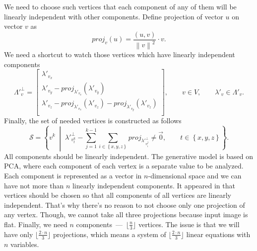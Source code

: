 We need to choose such vertices that each component of any of them
will be linearly independent with other components.
Define projection of vector $u$ on vector $v$ as
\begin{equation*}
  proj_v\left( u \right)
  = \frac{\left( u, v \right)}{\left\| v \right\|^2} \cdot v.
\end{equation*}
We need a shortcut to watch those vertices
which have linearly independent components
\begin{equation*}
  \Lambda'^{\perp}_v = \begin{bmatrix}
    \lambda'_{v_x} \\
    \lambda'_{v_y} - proj_{\lambda'_{v_x}}\left( \lambda'_{v_y} \right) \\
    \lambda'_{v_z} - proj_{\lambda'_{v_x}}\left( \lambda'_{v_z} \right)
                   - proj_{\lambda'_{v_y}}\left( \lambda'_{v_z} \right) \\
  \end{bmatrix},
  \qquad v \in V,
  \qquad \lambda'_v \in \Lambda'_v.
\end{equation*}
Finally, the set of needed vertices is constructed as follows
\begin{equation*}
  \mathcal{S}
  = \left\{ v^k \;\middle|\;
    \lambda'^{\perp}_{v^k_t}
    - \sum_{j = 1}^{k - 1} \sum_{i \in \left\{ x, y, z \right\}}
    proj_{\lambda'^{\perp}_{v^j_i}} \neq \vec{0},
    \qquad t \in \left\{ x, y, z \right\}
  \right\}.
\end{equation*}
All components should be linearly independent.
The generative model is based on PCA,
where each component of each vertex is a separate value to be analyzed.
Each component is represented as a vector in $n$-dimensional space
and we can have not more than $n$ linearly independent components.
It appeared in \label{eq:components:independent}
that vertices should be chosen so that
all components of all vertices are linearly independent.
That's why there's no reason to not choose only one projection of any vertex.
Though, we cannot take all three projections because input image is flat.
Finally, we need $n$ components~---~$\lfloor \frac{n}{3} \rfloor$ vertices.
The issue is that we will have only $\lfloor \frac{2 \cdot n}{3} \rfloor$
projections,
which means a system of $\lfloor \frac{2 \cdot n}{3} \rfloor$ linear equations
with $n$ variables.
